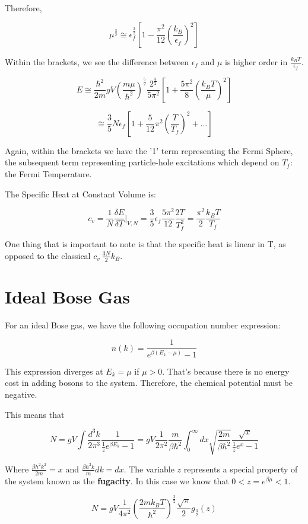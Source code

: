 \documentclass{article}
\newcommand{\thermdif}[4]{\frac{\delta#1}{\delta#2}\vert_{#3,#4}}
\newcommand{\bltz}{k_{B}}
\newcommand{\dtk}{\frac{d^{3}k}{2\pi^{3}}}
\newcommand{\qmom}{\frac{\hbar^{2}}{2m}}
\begin{document}
Therefore,

$$\mu^{\frac{3}{2}}\cong\epsilon_{f}^{\frac{3}{2}}[1-\frac{\pi^{2}}{12}(\frac{\bltz}{\epsilon_{f}})^{2}]$$

Within the brackets, we see the difference between $\epsilon_{f}$ and $\mu$ is higher order in $\frac{\bltz T}{\epsilon_{f}}$.

$$E\cong\qmom gV(\frac{m\mu}{\hbar^{2}})^{\frac{5}{2}}\frac{2^{\frac{3}{2}}}{5\pi^{2}}[1+\frac{5\pi^{2}}{8}(\frac{\bltz T}{\mu})^{2}]$$

$$\cong\frac{3}{5}N\epsilon_{f}[1+\frac{5}{12}\pi^{2}(\frac{T}{T_{f}})^{2}+...]$$

Again, within the brackets we have the '1' term representing the Fermi Sphere, the subsequent term representing particle-hole excitations which depend on $T_{f}$: the Fermi Temperature.

The Specific Heat at Constant Volume is:

$$c_{v}=\frac{1}{N}\thermdif{E}{T}{V}{N}=\frac{3}{5}\epsilon_{f}\frac{5\pi^{2}}{12}\frac{2T}{T_{f}^{2}}=\frac{\pi^{2}}{2}\frac{\bltz T}{T_{f}}$$

One thing that is important to note is that the specific heat is linear in T, as opposed to the classical $c_{v}~\frac{3N}{2}\bltz$.

\section{Ideal Bose Gas}

For an ideal Bose gas, we have the following occupation number expression:

$$n(k)=\frac{1}{e^{\beta(E_{k}-\mu)}-1}$$


This expression diverges at $E_{k}=\mu$ if $\mu>0$.  That's because there is no energy cost in adding bosons to the system.  Therefore, the chemical potential must be negative.

This means that 

$$N=gV\int\dtk\frac{1}{\frac{1}{z}e^{\beta E_{k}}-1}=gV\frac{1}{2\pi^{2}}\frac{m}{\beta\hbar^{2}}\int_{0}^{\infty}dx\sqrt{\frac{2m}{\beta\hbar^{2}}}\frac{\sqrt{x}}{\frac{1}{z}e^{x}-1}$$

Where $\frac{\beta\hbar^{2}k^{2}}{2m}=x$ and $\frac{\beta\hbar^{2}k}{m}dk=dx$.  The variable $z$ represents a special property of the system known as the \textbf{fugacity}.  In this case we know that $0<z=e^{\beta\mu}<1$.

$$N=gV\frac{1}{4\pi^{2}}(\frac{2m\bltz T}{\hbar^{2}})^{\frac{3}{2}}\frac{\sqrt{\pi}}{2}g_{\frac{3}{2}}(z)$$
\end{document}
